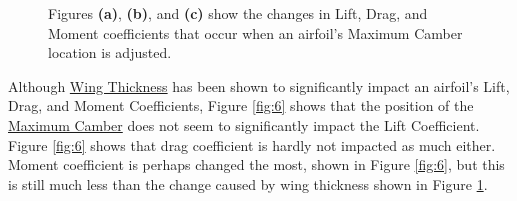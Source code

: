 \documentclass{article}
\begin{document}
\begin{figure}[!htb]
  \centering
  \caption{Figures \textbf{(a)}, \textbf{(b)}, and \textbf{(c)} show the changes in Lift, Drag, and Moment coefficients that occur when an airfoil's Maximum Camber location is adjusted.}
  \label{fig:5}
\end{figure}

Although \hyperlink{Th}{Wing Thickness} has been shown to significantly impact an airfoil's Lift, Drag, and Moment Coefficients, Figure \ref{fig:6} shows that the position of the \hyperlink{Camber}{Maximum Camber} does not seem to significantly impact the Lift Coefficient. Figure \ref{fig:6} shows that drag coefficient is hardly not impacted as much either. Moment coefficient is perhaps changed the most, shown in Figure \ref{fig:6}, but this is still much less than the change caused by wing thickness shown in Figure \ref{fig:5}.
\end{document}
